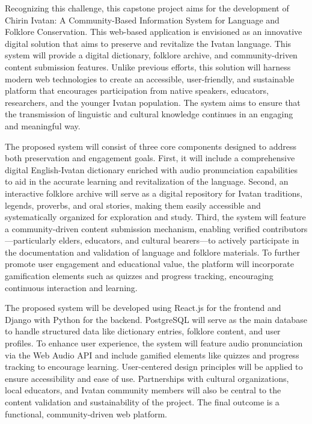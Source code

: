             Recognizing this challenge, this capstone project aims for the development of Chirin Ivatan: A Community-Based Information System for Language and Folklore Conservation. This web-based application is envisioned as an innovative digital solution that aims to preserve and revitalize the Ivatan language. This system will provide a digital dictionary, folklore archive, and community-driven content submission features. Unlike previous efforts, this solution will harness modern web technologies to create an accessible, user-friendly, and sustainable platform that encourages participation from native speakers, educators, researchers, and the younger Ivatan population. The system aims to ensure that the transmission of linguistic and cultural knowledge continues in an engaging and meaningful way.
            
            The proposed system will consist of three core components designed to address both preservation and engagement goals. First, it will include a comprehensive digital English-Ivatan dictionary enriched with audio pronunciation capabilities to aid in the accurate learning and revitalization of the language. Second, an interactive folklore archive will serve as a digital repository for Ivatan traditions, legends, proverbs, and oral stories, making them easily accessible and systematically organized for exploration and study. Third, the system will feature a community-driven content submission mechanism, enabling verified contributors—particularly elders, educators, and cultural bearers—to actively participate in the documentation and validation of language and folklore materials. To further promote user engagement and educational value, the platform will incorporate gamification elements such as quizzes and progress tracking, encouraging continuous interaction and learning. 
            
            The proposed system will be developed using React.js for the frontend and Django with Python for the backend. PostgreSQL will serve as the main database to handle structured data like dictionary entries, folklore content, and user profiles. To enhance user experience, the system will feature audio pronunciation via the Web Audio API and include gamified elements like quizzes and progress tracking to encourage learning. User-centered design principles will be applied to ensure accessibility and ease of use. Partnerships with cultural organizations, local educators, and Ivatan community members will also be central to the content validation and sustainability of the project. The final outcome is a functional, community-driven web platform.

